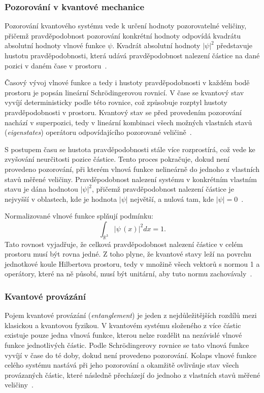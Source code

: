 \subsubsection*{Pozorování v kvantové mechanice}
Pozorování kvantového systému vede k určení hodnoty pozorovatelné veličiny, přičemž pravděpodobnost pozorování konkrétní hodnoty odpovídá kvadrátu absolutní hodnoty vlnové funkce $\psi$.
Kvadrát absolutní hodnoty $\left| \psi \right|^2$ představuje hustotu pravděpodobnosti, která udává pravděpodobnost nalezení částice na dané pozici v daném čase v prostoru~\cite{NaturalComputing}. 
    
Časový vývoj vlnové funkce a tedy i hustoty pravděpodobnosti v každém bodě prostoru je popsán lineární Schrödingerovou rovnicí. 
V čase se kvantový stav vyvíjí deterministicky podle této rovnice, což způsobuje rozptyl hustoty pravděpodobnosti v prostoru. 
Kvantový stav se před provedením pozorování nachází v superpozici, tedy v lineární kombinaci všech možných vlastních stavů (\emph{eigenstates}) operátoru odpovídajícího pozorované veličině~\cite{NaturalComputing}. 
    
S postupem času se hustota pravděpodobnosti stále více rozprostírá, což vede ke zvyšování neurčitosti pozice částice. 
Tento proces pokračuje, dokud není provedeno pozorování, při kterém vlnová funkce nelineárně  do jednoho z vlastních stavů měřené veličiny. 
Pravděpodobnost nalezení systému v konkrétním vlastním stavu je dána hodnotou $\left| \psi \right|^2$, přičemž pravděpodobnost nalezení částice je nejvyšší v oblastech, kde je hodnota $\left| \psi \right|$ největší, a nulová tam, kde $\left| \psi \right| = 0$~\cite{NaturalComputing}.
    
Normalizované vlnové funkce splňují podmínku:
\begin{equation*}
    \int_{\mathbb{R}^3} \left|\psi\,(x)\right|^2 dx = 1.    
\end{equation*}
Tato rovnost vyjadřuje, že celková pravděpodobnost nalezení částice v celém prostoru musí být rovna jedné.
Z toho plyne, že kvantové stavy leží na povrchu jednotkové koule Hilbertova prostoru, tedy v množině všech vektorů s normou 1 a operátory, které na ně působí, musí být unitární, aby tuto normu zachovávaly~\cite{NaturalComputing}.

\subsubsection*{Kvantové provázání}
Pojem kvantové provázání (\emph{entanglement}) je jeden z nejdůležitějších rozdílů mezi klasickou a kvantovou fyzikou. 
V kvantovém systému složeného z více částic existuje pouze jedna vlnová funkce, kterou nelze rozdělit na nezávislé vlnové funkce jednotlivých částic. 
Podle Schrödingerovy rovnice se tato vlnová funkce vyvíjí v čase do té doby, dokud není provedeno pozorování.
Kolaps vlnové funkce celého systému nastává při jeho pozorování a okamžitě ovlivňuje stav všech provázaných částic, které následně přecházejí do jednoho z vlastních stavů měřené veličiny~\cite{NaturalComputing}.

